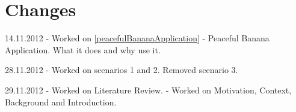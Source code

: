 \chapter*{Changes}
\begin{description}
\item 14.11.2012 - Worked on \autoref{peacefulBananaApplication} - Peaceful Banana Application. What it does and why use it.
\item 28.11.2012 - Worked on scenarios 1 and 2. Removed scenario 3. 
\item 29.11.2012 - Worked on Literature Review. - Worked on Motivation, Context, Background and Introduction. 
\end{description}